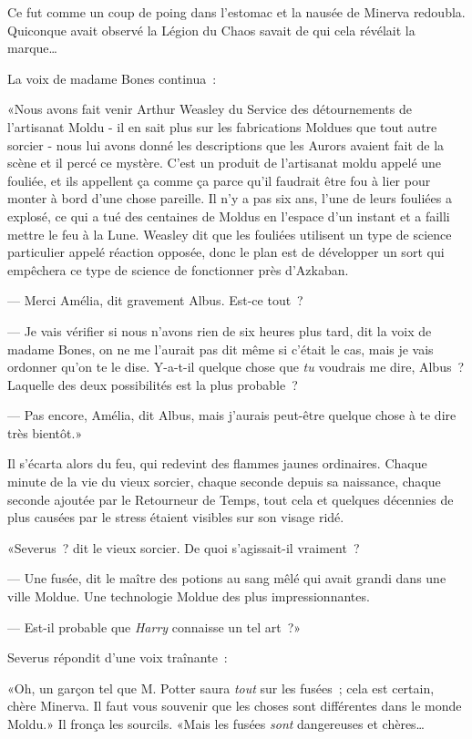 Ce fut comme un coup de poing dans l'estomac et la nausée de Minerva redoubla. Quiconque avait observé la Légion du Chaos savait de qui cela révélait la marque…

La voix de madame Bones continua~:

«Nous avons fait venir Arthur Weasley du Service des détournements de l'artisanat Moldu - il en sait plus sur les fabrications Moldues que tout autre sorcier - nous lui avons donné les descriptions que les Aurors avaient fait de la scène et il percé ce mystère. C'est un produit de l'artisanat moldu appelé une fouliée, et ils appellent ça comme ça parce qu'il faudrait être fou à lier pour monter à bord d'une chose pareille. Il n'y a pas six ans, l'une de leurs fouliées a explosé, ce qui a tué des centaines de Moldus en l'espace d'un instant et a failli mettre le feu à la Lune. Weasley dit que les fouliées utilisent un type de science particulier appelé réaction opposée, donc le plan est de développer un sort qui empêchera ce type de science de fonctionner près d'Azkaban.

--- Merci Amélia, dit gravement Albus. Est-ce tout~?

--- Je vais vérifier si nous n'avons rien de six heures plus tard, dit la voix de madame Bones, on ne me l'aurait pas dit même si c'était le cas, mais je vais ordonner qu'on te le dise. Y-a-t-il quelque chose que \emph{tu} voudrais me dire, Albus~? Laquelle des deux possibilités est la plus probable~?

--- Pas encore, Amélia, dit Albus, mais j'aurais peut-être quelque chose à te dire très bientôt.»

Il s'écarta alors du feu, qui redevint des flammes jaunes ordinaires. Chaque minute de la vie du vieux sorcier, chaque seconde depuis sa naissance, chaque seconde ajoutée par le Retourneur de Temps, tout cela et quelques décennies de plus causées par le stress étaient visibles sur son visage ridé.

«Severus~? dit le vieux sorcier. De quoi s'agissait-il vraiment~?

--- Une fusée, dit le maître des potions au sang mêlé qui avait grandi dans une ville Moldue. Une technologie Moldue des plus impressionnantes.

--- Est-il probable que \emph{Harry} connaisse un tel art~?»

Severus répondit d'une voix traînante~:

«Oh, un garçon tel que M. Potter saura \emph{tout} sur les fusées~; cela est certain, chère Minerva. Il faut vous souvenir que les choses sont différentes dans le monde Moldu.» Il fronça les sourcils. «Mais les fusées \emph{sont} dangereuses et chères…

